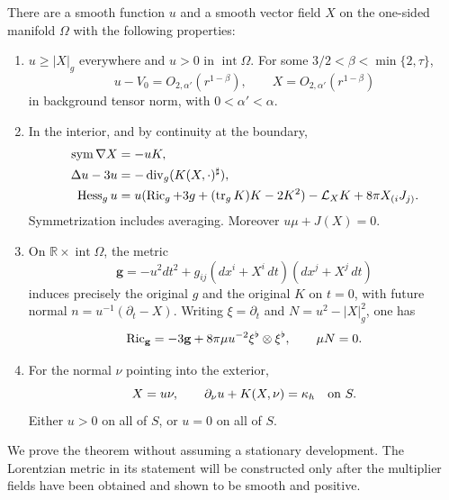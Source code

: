 \begin{theorem}
\label{eq-causal-killing}
There are a smooth function \(u\) and a smooth vector field \(X\) on the
one-sided manifold \(\Omega\) with the following properties:
\begin{enumerate}
\item \(u\geq |X|_g\) everywhere and \(u>0\) in \(\operatorname{int}\Omega\).
For some \(3/2<\beta<\min\{2,\tau\}\),
\begin{equation}
 u-V_0=O_{2,\alpha'}(r^{1-\beta}),\qquad
 X=O_{2,\alpha'}(r^{1-\beta})
 \label{eq-end-normalization}
\end{equation}
in background tensor norm, with \(0<\alpha'<\alpha\).
\item In the interior, and by continuity at the boundary,
\begin{align}
 \operatorname{sym}\nabla X&=-uK, \label{eq-shift}\\
 \Delta u-3u&=-\operatorname{div}_g(K(X,\cdot)^\sharp),\label{eq-lapse}\\
 \operatorname{Hess}_g u&=
 u(\operatorname{Ric}_g+3g+(\operatorname{tr}_gK)K-2K^2)
 -\mathcal L_XK+8\pi X_{(i}J_{j)}. \label{eq-full-lapse}
\end{align}
Symmetrization includes averaging.  Moreover \(u\mu+J(X)=0\).
\item On \(\mathbb R\times\operatorname{int}\Omega\), the metric
\begin{equation}
 \mathbf g=-u^2dt^2+
 g_{ij}(dx^i+X^i\,dt)(dx^j+X^j\,dt)
 \label{eq-stationary-metric}
\end{equation}
induces precisely the original \(g\) and the original \(K\) on \(t=0\),
with future normal \(n=u^{-1}(\partial_t-X)\).  Writing
\(\xi=\partial_t\) and \(N=u^2-|X|_g^2\), one has
\begin{equation}
 \operatorname{Ric}_{\mathbf g}=-3\mathbf g+
       8\pi\mu u^{-2}\xi^\flat\otimes\xi^\flat,\qquad
 \mu N=0 .
 \label{eq-null-matter}
\end{equation}
\item For the normal \(\nu\) pointing into the exterior,
\begin{equation}
 X=u\nu,\qquad
 \partial_\nu u+K(X,\nu)=\kappa_h\quad\hbox{on }S.
 \label{eq-horizon-data}
\end{equation}
Either \(u>0\) on all of \(S\), or \(u=0\) on all of \(S\).
\end{enumerate}
\end{theorem}

We prove the theorem without assuming a stationary development.  The
Lorentzian metric in its statement will be constructed only after the
multiplier fields have been obtained and shown to be smooth and positive.

